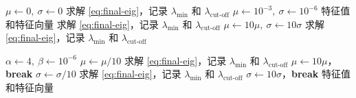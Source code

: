 \begin{algorithm}[htbp]
  \caption{自适应位移：初始化阶段}\label{alg:adaptive-shifting}
  \begin{algorithmic}[1]
    \STATE $\mu \gets 0,\ \sigma \gets 0$
    \STATE 求解 \cref{eq:final-eig}，记录 $\lambda_{\min}$ 和 $\lambda_{\text{cut-off}}$
      \STATE $\mu \gets 10^{-3},\ \sigma \gets 10^{-6}$
    \ELSE
      \RETURN 特征值和特征向量
    \ENDIF
    \STATE 求解 \cref{eq:final-eig}，记录 $\lambda_{\min}$ 和 $\lambda_{\text{cut-off}}$
      \STATE $\mu \gets 10\mu,\ \sigma \gets 10\sigma$
      \STATE 求解 \cref{eq:final-eig}，记录 $\lambda_{\min}$ 和 $\lambda_{\text{cut-off}}$
    \ENDWHILE
  \end{algorithmic}
\end{algorithm}

\begin{algorithm}[htbp]
  \caption{自适应位移：自适应回退阶段}\label{alg:adaptive-shifting-refine}
  \begin{algorithmic}[1]
    \STATE $\alpha \gets 4,\ \beta \gets 10^{-6}$
    \WHILE{$\mu \ge \beta \lambda_{\min}$}
      \STATE $\mu \gets \mu / 10$
      \STATE 求解 \cref{eq:final-eig}，记录 $\lambda_{\min}$ 和 $\lambda_{\text{cut-off}}$
        \STATE $\mu \gets 10\mu$，\textbf{break}
      \ENDIF
    \ENDWHILE
      \STATE $\sigma \gets \sigma / 10$
      \STATE 求解 \cref{eq:final-eig}，记录 $\lambda_{\min}$ 和 $\lambda_{\text{cut-off}}$
        \STATE $\sigma \gets 10\sigma$，\textbf{break}
      \ENDIF
    \ENDWHILE
    \RETURN 特征值和特征向量
  \end{algorithmic}
\end{algorithm}